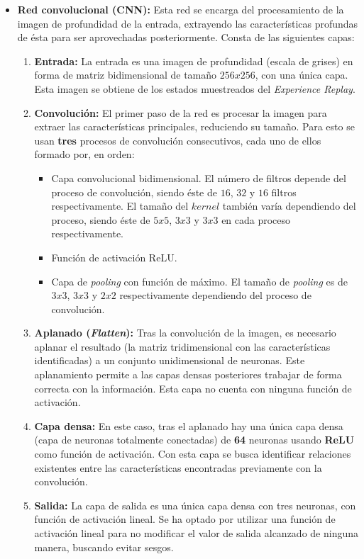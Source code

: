 \begin{itemize}

\item \textbf{Red convolucional (CNN):} Esta red se encarga del procesamiento de la imagen de profundidad de la entrada, extrayendo las características profundas de ésta para ser aprovechadas posteriormente. Consta de las siguientes capas:
\begin{enumerate}
	\item \textbf{Entrada:} La entrada es una imagen de profundidad (escala de grises) en forma de matriz bidimensional de tamaño $256x256$, con una única capa. Esta imagen se obtiene de los estados muestreados del \textit{Experience Replay}.
	\item \textbf{Convolución:} El primer paso de la red es procesar la imagen para extraer las características principales, reduciendo su tamaño. Para esto se usan \textbf{tres} procesos de convolución consecutivos, cada uno de ellos formado por, en orden:
	\begin{itemize}
		\item Capa convolucional bidimensional. El número de filtros depende del proceso de convolución, siendo éste de $16$, $32$ y $16$ filtros respectivamente. El tamaño del $kernel$ también varía dependiendo del proceso, siendo éste de $5x5$, $3x3$ y $3x3$ en cada proceso respectivamente.
		\item Función de activación ReLU.
		\item Capa de \textit{pooling} con función de máximo. El tamaño de \textit{pooling} es de $3x3$, $3x3$ y $2x2$ respectivamente dependiendo del proceso de convolución.
	\end{itemize}
	\item \textbf{Aplanado (\textit{Flatten}):} Tras la convolución de la imagen, es necesario aplanar el resultado (la matriz tridimensional con las características identificadas) a un conjunto unidimensional de neuronas. Este aplanamiento permite a las capas densas posteriores trabajar de forma correcta con la información. Esta capa no cuenta con ninguna función de activación.
	\item \textbf{Capa densa:} En este caso, tras el aplanado hay una única capa densa (capa de neuronas totalmente conectadas) de \textbf{64} neuronas usando \textbf{ReLU} como función de activación. Con esta capa se busca identificar relaciones existentes entre las características encontradas previamente con la convolución.
	\item \textbf{Salida:} La capa de salida es una única capa densa con tres neuronas, con función de activación lineal. Se ha optado por utilizar una función de activación lineal para no modificar el valor de salida alcanzado de ninguna manera, buscando evitar sesgos.
	

\end{enumerate}
\end{itemize}
